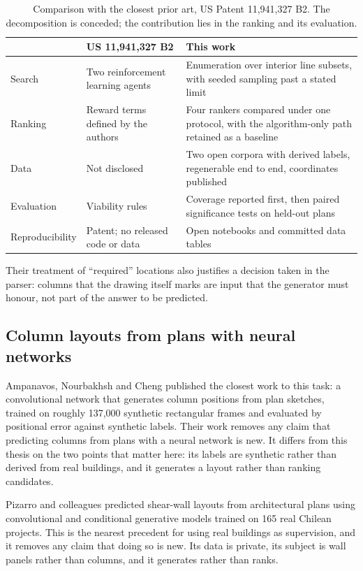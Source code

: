 \begin{table}[H]
\centering
\caption[Comparison with the closest prior art]{Comparison with the
closest prior art, US Patent 11,941,327 B2. The decomposition is conceded;
the contribution lies in the ranking and its evaluation.}
\label{tab:patent}
\small
\begin{tabularx}{\textwidth}{lXX}
\toprule
 & \textbf{US 11,941,327 B2} & \textbf{This work} \\
\midrule
Search & Two reinforcement learning agents & Enumeration over interior
line subsets, with seeded sampling past a stated limit \\
Ranking & Reward terms defined by the authors & Four rankers compared
under one protocol, with the algorithm-only path retained as a baseline \\
Data & Not disclosed & Two open corpora with derived labels, regenerable
end to end, coordinates published \\
Evaluation & Viability rules & Coverage reported first, then paired
significance tests on held-out plans \\
Reproducibility & Patent; no released code or data & Open notebooks and
committed data tables \\
\bottomrule
\end{tabularx}
\end{table}

Their treatment of ``required'' locations also justifies a decision taken
in the parser: columns that the drawing itself marks are input that the
generator must honour, not part of the answer to be predicted.

\subsection{Column layouts from plans with neural networks}

Ampanavos, Nourbakhsh and Cheng \citep{ampanavos2021approxiframer}
published the closest work to this task: a convolutional network that
generates column positions from plan sketches, trained on roughly 137,000
synthetic rectangular frames and evaluated by positional error against
synthetic labels. Their work removes any claim that predicting columns
from plans with a neural network is new. It differs from this thesis on
the two points that matter here: its labels are synthetic rather than
derived from real buildings, and it generates a layout rather than ranking
candidates.

Pizarro and colleagues \citep{pizarro2021walls} predicted shear-wall
layouts from architectural plans using convolutional and conditional
generative models trained on 165 real Chilean projects. This is the
nearest precedent for using real buildings as supervision, and it removes
any claim that doing so is new. Its data is private, its subject is wall
panels rather than columns, and it generates rather than ranks.

